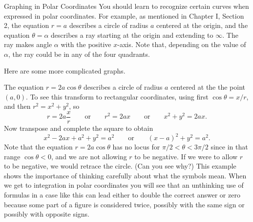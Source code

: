 \subhead Graphing in Polar Coordinates \endsubhead
You should learn to recognize certain curves when expressed in
polar coordinates.  For example, as mentioned in Chapter I,
Section 2,
 the equation $r = a$ describes a circle
of radius $a$ centered at the origin, and
the equation $\theta = \alpha$ describes a ray
starting at the origin and extending to $\infty$.   The ray makes
angle $\alpha$ with the positive $x$-axis. Note that, depending on
the value of $\alpha$, the ray could be in any of the four quadrants.
%

Here are some more complicated graphs.

\nextex
{}  The equation $r = 2a\cos \theta$ describes a circle
of radius $a$ centered at the the point $(a, 0)$.  To see this
transform to rectangular coordinates, using first  $\cos\theta = x/r$,
and then $r^2 = x^2 + y^2$,
so
$$
    r = 2a\frac xr\qquad\text{or}\qquad r^2 = 2a x\qquad\text{or}
\qquad x^2 + y^2 = 2ax.
$$
Now transpose and complete the square to obtain
$$
   x^2 -2ax + a^2 + y^2 = a^2\qquad\text{or}\qquad (x - a)^2 + y^2 = a^2.
$$
Note that the equation $r = 2a\cos \theta$ has no locus for
$\pi/2 < \theta < 3\pi/2$ since in that range $\cos\theta < 0$,
and we are not allowing $r$ to be negative.  If we were to allow
$r$ to be negative, we would retrace the circle.  (Can you see
why?)  This example shows the importance of thinking carefully
about what the symbols mean.  When we get to integration in
polar coordinates you will see that an unthinking use of formulas
in a case like this can lead either to double the correct answer
or zero because some part of a figure is considered twice,
possibly with the same sign or possibly with opposite signs.
\endexample

